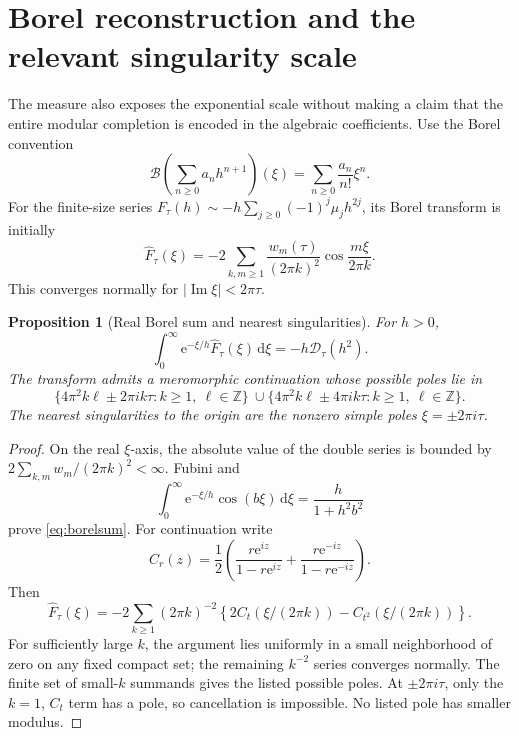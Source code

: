 \documentclass[11pt,a4paper]{article}
\newcommand{\ee}{\mathrm e}
\newcommand{\dd}{\,\mathrm d}
\newcommand{\D}{\mathcal D}
\newcommand{\Z}{\mathbb Z}
\numberwithin{equation}{section}
\theoremstyle{plain}
\newtheorem{proposition}[theorem]{Proposition}
\theoremstyle{definition}
\theoremstyle{remark}
\begin{document}
\section{Borel reconstruction and the relevant singularity scale}
\label{sec:borel}

The measure also exposes the exponential scale without making a claim that
the entire modular completion is encoded in the algebraic coefficients.
Use the Borel convention
\[
 \mathcal B\!\left(\sum_{n\ge0}a_nh^{n+1}\right)(\xi)
   =\sum_{n\ge0}\frac{a_n}{n!}\xi^n.
\]
For the finite-size series $F_\tau(h)\sim-h\sum_{j\ge0}(-1)^j\mu_jh^{2j}$,
its Borel transform is initially
\begin{equation}
 \widehat F_\tau(\xi)
 =-2\sum_{k,m\ge1}\frac{w_m(\tau)}{(2\pi k)^2}
                       \cos\frac{m\xi}{2\pi k}.
 \label{eq:borel}
\end{equation}
This converges normally for $|\operatorname{Im}\xi|<2\pi\tau$.

\begin{proposition}[Real Borel sum and nearest singularities]
\label{prop:borel}
For $h>0$,
\begin{equation}
 \int_0^\infty\ee^{-\xi/h}\widehat F_\tau(\xi)\dd\xi
       =-h\D_\tau(h^2).
 \label{eq:borelsum}
\end{equation}
The transform admits a meromorphic continuation whose possible poles lie in
\begin{equation}
 \{4\pi^2k\ell\pm2\pi i k\tau:k\ge1,\ \ell\in\Z\}
 \ \cup
 \{4\pi^2k\ell\pm4\pi i k\tau:k\ge1,\ \ell\in\Z\}.
 \label{eq:poleset}
\end{equation}
The nearest singularities to the origin are the nonzero simple poles
$\xi=\pm2\pi i\tau$.
\end{proposition}
\begin{proof}
On the real $\xi$-axis, the absolute value of the double series is bounded by
$2\sum_{k,m}w_m/(2\pi k)^2<\infty$. Fubini and
\[
 \int_0^\infty\ee^{-\xi/h}\cos(b\xi)\dd\xi
       =\frac h{1+h^2b^2}
\]
prove \eqref{eq:borelsum}. For continuation write
\[
 C_r(z)=\frac12\left(\frac{r\ee^{iz}}{1-r\ee^{iz}}
                       +\frac{r\ee^{-iz}}{1-r\ee^{-iz}}\right).
\]
Then
\[
 \widehat F_\tau(\xi)=-2\sum_{k\ge1}(2\pi k)^{-2}
      \left\{2C_t(\xi/(2\pi k))-C_{t^2}(\xi/(2\pi k))\right\}.
\]
For sufficiently large $k$, the argument lies uniformly in a small
neighborhood of zero on any fixed compact set; the remaining $k^{-2}$
series converges normally. The finite set of small-$k$ summands gives the
listed possible poles. At $\pm2\pi i\tau$, only the $k=1$, $C_t$ term has a
pole, so cancellation is impossible. No listed pole has smaller modulus.
\end{proof}
\end{document}

